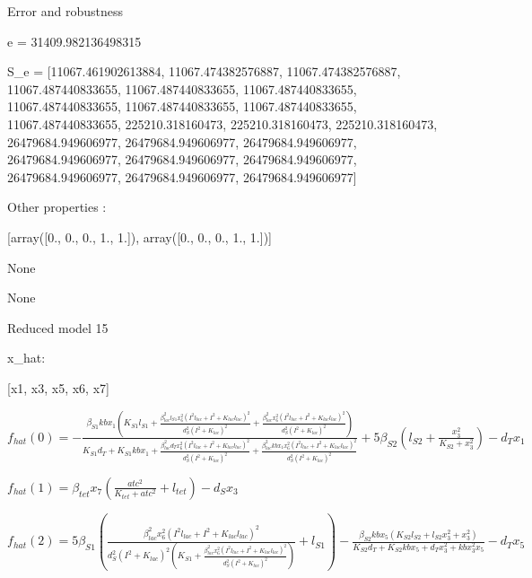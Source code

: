 Error and robustness 


e = 31409.982136498315

S_e = [11067.461902613884, 11067.474382576887, 11067.474382576887, 11067.487440833655, 11067.487440833655, 11067.487440833655, 11067.487440833655, 11067.487440833655, 11067.487440833655, 11067.487440833655, 225210.318160473, 225210.318160473, 225210.318160473, 26479684.949606977, 26479684.949606977, 26479684.949606977, 26479684.949606977, 26479684.949606977, 26479684.949606977, 26479684.949606977, 26479684.949606977, 26479684.949606977]

Other properties :


[array([0., 0., 0., 1., 1.]), array([0., 0., 0., 1., 1.])]

None

None

Reduced model 15

x_{hat}: 

[x1, x3, x5, x6, x7]


$f_{hat}(0)=- \frac{\beta_{S1} kb x_{1} \left(K_{S1} l_{S1} + \frac{\beta_{lac}^{2} l_{S1} x_{6}^{2} \left(I^{2} l_{lac} + I^{2} + K_{lac} l_{lac}\right)^{2}}{d_{S}^{2} \left(I^{2} + K_{lac}\right)^{2}} + \frac{\beta_{lac}^{2} x_{6}^{2} \left(I^{2} l_{lac} + I^{2} + K_{lac} l_{lac}\right)^{2}}{d_{S}^{2} \left(I^{2} + K_{lac}\right)^{2}}\right)}{K_{S1} d_{T} + K_{S1} kb x_{1} + \frac{\beta_{lac}^{2} d_{T} x_{6}^{2} \left(I^{2} l_{lac} + I^{2} + K_{lac} l_{lac}\right)^{2}}{d_{S}^{2} \left(I^{2} + K_{lac}\right)^{2}} + \frac{\beta_{lac}^{2} kb x_{1} x_{6}^{2} \left(I^{2} l_{lac} + I^{2} + K_{lac} l_{lac}\right)^{2}}{d_{S}^{2} \left(I^{2} + K_{lac}\right)^{2}}} + 5 \beta_{S2} \left(l_{S2} + \frac{x_{3}^{2}}{K_{S2} + x_{3}^{2}}\right) - d_{T} x_{1}$


$f_{hat}(1)=\beta_{tet} x_{7} \left(\frac{atc^{2}}{K_{tet} + atc^{2}} + l_{tet}\right) - d_{S} x_{3}$


$f_{hat}(2)=5 \beta_{S1} \left(\frac{\beta_{lac}^{2} x_{6}^{2} \left(I^{2} l_{lac} + I^{2} + K_{lac} l_{lac}\right)^{2}}{d_{S}^{2} \left(I^{2} + K_{lac}\right)^{2} \left(K_{S1} + \frac{\beta_{lac}^{2} x_{6}^{2} \left(I^{2} l_{lac} + I^{2} + K_{lac} l_{lac}\right)^{2}}{d_{S}^{2} \left(I^{2} + K_{lac}\right)^{2}}\right)} + l_{S1}\right) - \frac{\beta_{S2} kb x_{5} \left(K_{S2} l_{S2} + l_{S2} x_{3}^{2} + x_{3}^{2}\right)}{K_{S2} d_{T} + K_{S2} kb x_{5} + d_{T} x_{3}^{2} + kb x_{3}^{2} x_{5}} - d_{T} x_{5}$


